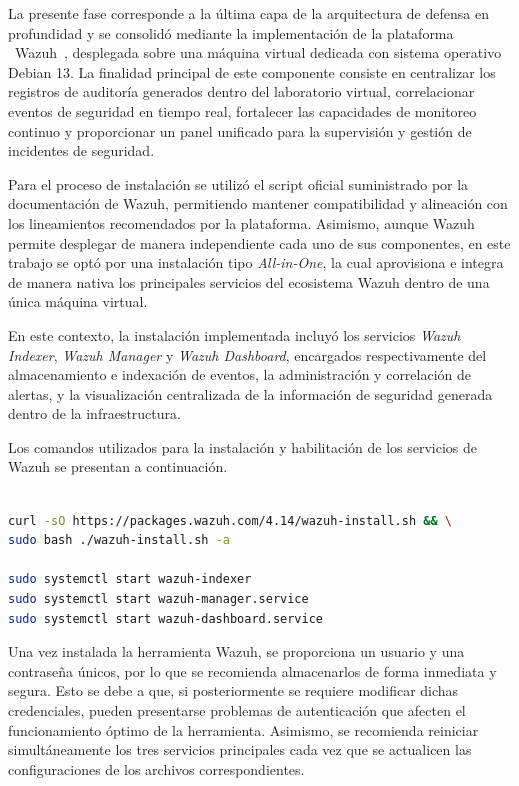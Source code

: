 La presente fase corresponde a la última capa de la arquitectura de defensa en profundidad y se consolidó mediante la implementación de la 
plataforma \SIEM\ Wazuh~\cite{WazuhDocs2026}, desplegada sobre una máquina virtual dedicada con sistema operativo Debian 13. La finalidad 
principal de este componente consiste en centralizar los registros de auditoría generados dentro del laboratorio virtual, correlacionar 
eventos de seguridad en tiempo real, fortalecer las capacidades de monitoreo continuo y proporcionar un panel unificado para la supervisión 
y gestión de incidentes de seguridad.

Para el proceso de instalación se utilizó el script oficial suministrado por la documentación de Wazuh, permitiendo mantener compatibilidad 
y alineación con los lineamientos recomendados por la plataforma. Asimismo, aunque Wazuh permite desplegar de manera independiente cada 
uno de sus componentes, en este trabajo se optó por una instalación tipo \textit{All-in-One}, la cual aprovisiona e integra de manera 
nativa los principales servicios del ecosistema Wazuh dentro de una única máquina virtual.

En este contexto, la instalación implementada incluyó los servicios \textit{Wazuh Indexer}, \textit{Wazuh Manager} y \textit{Wazuh 
Dashboard}, encargados respectivamente del almacenamiento e indexación de eventos, la administración y correlación de alertas, y la 
visualización centralizada de la información de seguridad generada dentro de la infraestructura.

Los comandos utilizados para la instalación y habilitación de los servicios de Wazuh se presentan a continuación.

\begin{lstlisting}[language=bash, caption={Instalación y activación de servicios de Wazuh}, label={lst:wazuh_install}]

curl -sO https://packages.wazuh.com/4.14/wazuh-install.sh && \
sudo bash ./wazuh-install.sh -a

sudo systemctl start wazuh-indexer
sudo systemctl start wazuh-manager.service
sudo systemctl start wazuh-dashboard.service

\end{lstlisting}

Una vez instalada la herramienta \SIEM Wazuh, se proporciona un usuario y una contraseña únicos, por lo que se recomienda almacenarlos de 
forma inmediata y segura. Esto se debe a que, si posteriormente se requiere modificar dichas credenciales, pueden presentarse problemas de 
autenticación que afecten el funcionamiento óptimo de la herramienta. Asimismo, se recomienda reiniciar simultáneamente los tres servicios 
principales cada vez que se actualicen las configuraciones de los archivos correspondientes.

